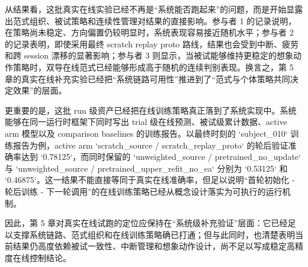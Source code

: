 \begin{table}[htbp]
    \centering
    \caption{`2026-04-19` 三参与者真实在线实验补充结果}
    \label{tab:c5_online_three_participants}
    \scriptsize
\end{table}

从结果看，这批真实在线实验已经不再是“系统能否跑起来”的问题，而是开始显露出范式组织、被试策略和连续性管理对结果的直接影响。参与者 1 的记录说明，在策略尚未稳定、方向偏置仍较明显时，系统表现容易接近随机水平；参与者 2 的记录表明，即使采用最终 scratch replay proto 路线，结果也会受到中断、疲劳和跨 session 漂移的显著影响；参与者 3 则显示，当被试能够维持更稳定的想象动作策略时，双导在线范式已经能够形成高于随机的连续判别表现。换言之，第 5 章的真实在线补充实验已经把“系统链路可用性”推进到了“范式与个体策略共同决定效果”的层面。

更重要的是，这批 run 级资产已经把在线训练策略真正落到了系统实现中。系统能够在同一运行时框架下同时写出 trial 级在线预测、被试级累计数据、active arm 模型以及 comparison baselines 的训练报告。以最终时刻的 `subject\_010` 训练报告为例，active arm `scratch\_source / scratch\_replay\_proto` 的轮后验证准确率达到 `0.78125`，而同时保留的 `unweighted\_source / pretrained\_no\_update` 与 `unweighted\_source / pretrained\_upper\_refit\_no\_ea` 分别为 `0.53125` 和 `0.46875`。这一结果不能直接等同于真实在线准确率，但足以说明“首轮初始化 - 轮后训练 - 下一轮调用”的在线训练策略已经从概念设计落实为可执行的运行机制。

因此，第 5 章对真实在线试跑的定位应保持在“系统级补充验证”层面：它已经足以支撑系统链路、范式组织和在线训练策略确已打通；但与此同时，也清楚表明当前结果仍高度依赖被试一致性、中断管理和想象动作设计，尚不足以写成稳定高精度在线控制结论。

